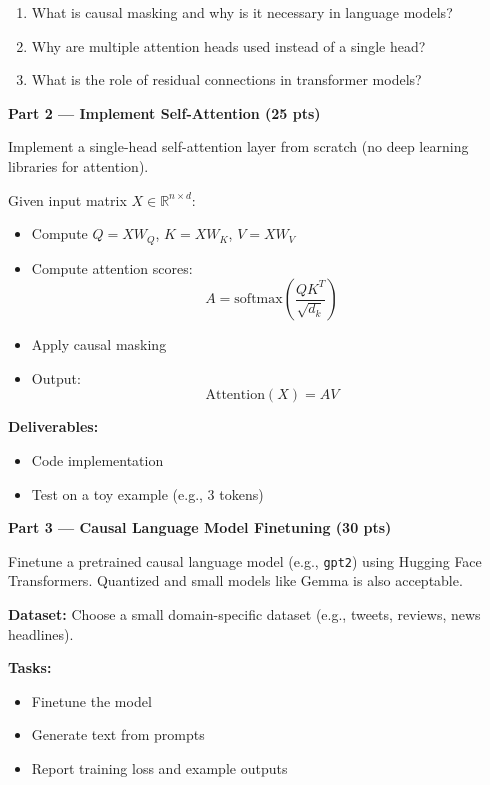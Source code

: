 \documentclass[12pt]{article}
\begin{document}
\begin{enumerate}[leftmargin=1.25em]
\begin{enumerate}
    \item What is causal masking and why is it necessary in language models?
    
    \item Why are multiple attention heads used instead of a single head?
    
    \item What is the role of residual connections in transformer models?
    
    \vspace{0.5em}

    \end{enumerate}
    
    \textbf{Part 2 — Implement Self-Attention (25 pts)}
    
    Implement a single-head self-attention layer from scratch (no deep learning libraries for attention).
    
    Given input matrix $X \in \mathbb{R}^{n \times d}$:
    
    \begin{itemize}
    \item Compute $Q = XW_Q$, $K = XW_K$, $V = XW_V$
    \item Compute attention scores:
    \[
    A = \text{softmax}\left(\frac{QK^T}{\sqrt{d_k}}\right)
    \]
    \item Apply causal masking
    \item Output:
    \[
    \text{Attention}(X) = AV
    \]
    \end{itemize}
    
    \textbf{Deliverables:}
    \begin{itemize}
    \item Code implementation
    \item Test on a toy example (e.g., 3 tokens)
    \end{itemize}
    
    \vspace{0.5em}
    
    \textbf{Part 3 — Causal Language Model Finetuning (30 pts)}
    
    Finetune a pretrained causal language model (e.g., \texttt{gpt2}) using Hugging Face Transformers. Quantized and small models like Gemma is also acceptable. 
    
    \textbf{Dataset:}
    Choose a small domain-specific dataset (e.g., tweets, reviews, news headlines).
    
    \textbf{Tasks:}
    \begin{itemize}
    \item Finetune the model
    \item Generate text from prompts
    \item Report training loss and example outputs
    \end{itemize}
    

\end{enumerate}
\end{document}
